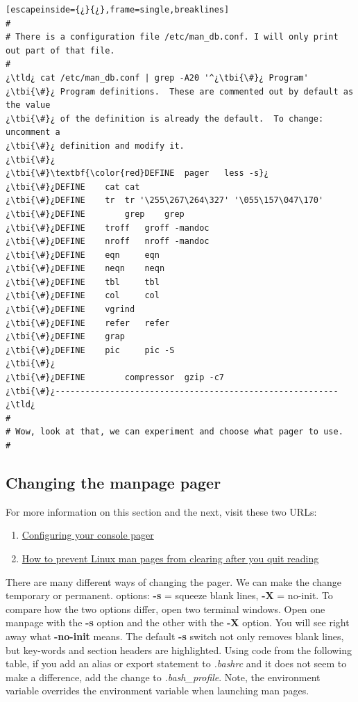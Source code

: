 \begin{lstlisting}[escapeinside={¿}{¿},frame=single,breaklines]
#
# There is a configuration file /etc/man_db.conf. I will only print out part of that file.
#
¿\tld¿ cat /etc/man_db.conf | grep -A20 '^¿\tbi{\#}¿ Program'
¿\tbi{\#}¿ Program definitions.  These are commented out by default as the value
¿\tbi{\#}¿ of the definition is already the default.  To change: uncomment a
¿\tbi{\#}¿ definition and modify it.
¿\tbi{\#}¿
¿\tbi{\#}\textbf{\color{red}DEFINE 	pager	less -s}¿
¿\tbi{\#}¿DEFINE 	cat	cat
¿\tbi{\#}¿DEFINE 	tr	tr '\255\267\264\327' '\055\157\047\170'
¿\tbi{\#}¿DEFINE		grep	grep
¿\tbi{\#}¿DEFINE 	troff 	groff -mandoc
¿\tbi{\#}¿DEFINE 	nroff 	nroff -mandoc
¿\tbi{\#}¿DEFINE 	eqn 	eqn
¿\tbi{\#}¿DEFINE 	neqn	neqn
¿\tbi{\#}¿DEFINE 	tbl 	tbl
¿\tbi{\#}¿DEFINE 	col 	col
¿\tbi{\#}¿DEFINE 	vgrind 	
¿\tbi{\#}¿DEFINE 	refer 	refer
¿\tbi{\#}¿DEFINE 	grap 	
¿\tbi{\#}¿DEFINE 	pic 	pic -S
¿\tbi{\#}¿
¿\tbi{\#}¿DEFINE		compressor	gzip -c7
¿\tbi{\#}¿---------------------------------------------------------
¿\tld¿
#
# Wow, look at that, we can experiment and choose what pager to use.
#
\end{lstlisting}

\subsection{Changing the manpage pager}

For more information on this section and the next, visit these two URLs:

\begin{enumerate}
	\item{\href{http://www.refining-linux.org/archives/3/Configuring-your-console-pager/}{Configuring your console pager}}
	\item{\href{http://linuxcommando.blogspot.ca/2008/05/how-to-prevent-linux-man-pages-from.html}{How to prevent Linux man pages from clearing after you quit reading}}
\end{enumerate}

There are many different ways of changing the pager. We can make the change temporary or permanent.  options: \textbf{-s} = squeeze blank lines, \textbf{-X} = no-init. To compare how the two options differ, open two terminal windows. Open one manpage with the \textbf{-s} option and the other with the \textbf{-X} option. You will see right away what \textbf{-no-init} means. The default \textbf{-s} switch not only removes blank lines, but key-words and section headers are highlighted. Using code from the following table, if you add an alias or export statement to \textsl{.bashrc} and it does not seem to make a difference, add the change to \textsl{.bash\_profile}. Note, the environment variable  overrides the environment variable  when launching man pages.

